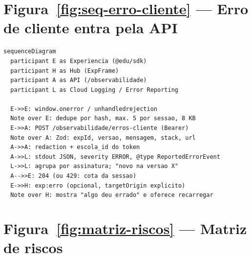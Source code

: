 \section{Figura~\ref{fig:seq-erro-cliente} --- Erro de cliente entra pela API}

\begin{lstlisting}[language=mermaid]
sequenceDiagram
  participant E as Experiencia (@edu/sdk)
  participant H as Hub (ExpFrame)
  participant A as API (/observabilidade)
  participant L as Cloud Logging / Error Reporting

  E->>E: window.onerror / unhandledrejection
  Note over E: dedupe por hash, max. 5 por sessao, 8 KB
  E->>A: POST /observabilidade/erros-cliente (Bearer)
  Note over A: Zod: expId, versao, mensagem, stack, url
  A->>A: redaction + escola_id do token
  A->>L: stdout JSON, severity ERROR, @type ReportedErrorEvent
  L->>L: agrupa por assinatura; "novo na versao X"
  A-->>E: 204 (ou 429: cota da sessao)
  E->>H: exp:erro (opcional, targetOrigin explicito)
  Note over H: mostra "algo deu errado" e oferece recarregar
\end{lstlisting}

\section{Figura~\ref{fig:matriz-riscos} --- Matriz de riscos}

